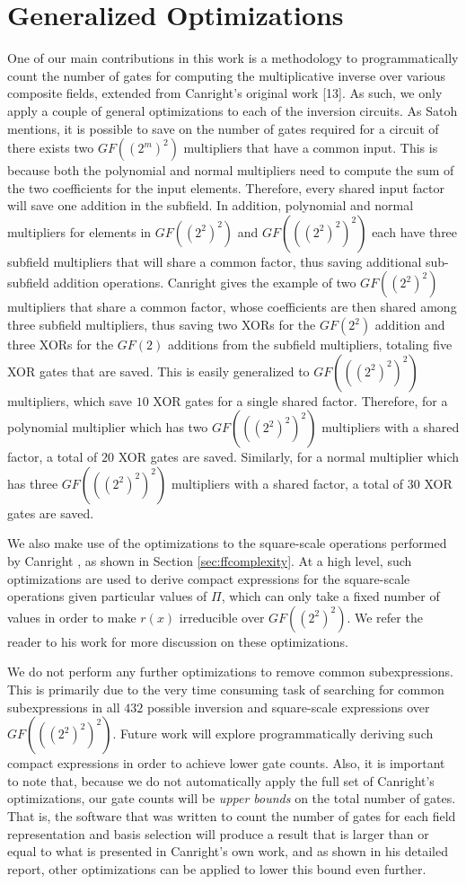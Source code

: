 \section{Generalized Optimizations}
One of our main contributions in this work is a methodology to programmatically count the number of gates for computing the multiplicative inverse over various composite fields, extended from Canright's original work [13]. As such, we only apply a couple of general optimizations to each of the inversion circuits. As Satoh \cite{Satoh01-1} mentions, it is possible to save on the number of gates required for a circuit of there exists two $GF((2^m)^2)$ multipliers that have a common input. This is because both the polynomial and normal multipliers need to compute the sum of the two coefficients for the input elements. Therefore, every shared input factor will save one addition in the subfield. In addition, polynomial and normal multipliers for elements in $GF((2^2)^2)$ and $GF(((2^2)^2)^2)$ each have three subfield multipliers that will share a common factor, thus saving additional sub-subfield addition operations. Canright gives the example of two $GF((2^2)^2)$ multipliers that share a common factor, whose coefficients are then shared among three subfield multipliers, thus saving two XORs for the $GF(2^2)$ addition and three XORs for the $GF(2)$ additions from the subfield multipliers, totaling five XOR gates that are saved. This is easily generalized to $GF(((2^2)^2)^2)$ multipliers, which save $10$ XOR gates for a single shared factor. Therefore, for a polynomial multiplier which has two $GF(((2^2)^2)^2)$ multipliers with a shared factor, a total of $20$ XOR gates are saved. Similarly, for a normal multiplier which has three $GF(((2^2)^2)^2)$ multipliers with a shared factor, a total of $30$ XOR gates are saved. 

We also make use of the optimizations to the square-scale operations performed by Canright \cite{Canright05-1}, as shown in Section \ref{sec:ffcomplexity}. At a high level, such optimizations are used to derive compact expressions for the square-scale operations given particular values of $\Pi$, which can only take a fixed number of values in order to make $r(x)$ irreducible over $GF((2^2)^2)$. We refer the reader to his work for more  discussion on these optimizations. 

We do not perform any further optimizations to remove common subexpressions. This is primarily due to the very time consuming task of searching for common subexpressions in all $432$ possible inversion and square-scale expressions over $GF(((2^2)^2)^2)$. Future work will explore programmatically deriving such compact expressions in order to achieve lower gate counts. Also, it is important to note that, because we do not automatically apply the full set of Canright's optimizations, our gate counts will be \emph{upper bounds} on the total number of gates. That is, the software that was written to count the number of gates for each field representation and basis selection will produce a result that is larger than or equal to what is presented in Canright's own work, and as shown in his detailed report, other optimizations can be applied to lower this bound even further.

